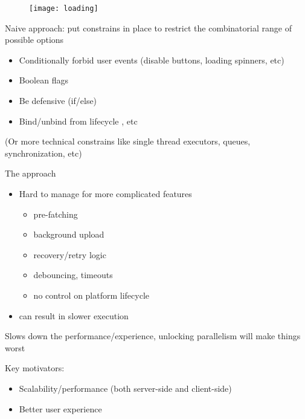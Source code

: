 \documentclass[10pt]{beamer}
\begin{document}
\begin{frame}[fragile]
	\begin{figure}
		\texttt{[image: loading]}
	\end{figure}
\end{frame}
\begin{frame}[fragile]
	Naive approach: put constrains in place to restrict the combinatorial range of possible options  
	\begin{itemize}
		\item Conditionally forbid user events (disable buttons, loading spinners, etc) 
		\item Boolean flags 
		\item Be defensive (if/else) 
		\item Bind/unbind from lifecycle , etc
	\end{itemize}
	(Or more technical constrains like single thread executors, queues, synchronization, etc)
\end{frame}

\begin{frame}
	The approach 
	\begin{itemize}
		\item Hard to manage for more complicated features
	\begin{itemize}
		\item pre-fatching
		\item background upload
		\item recovery/retry logic 
		\item debouncing, timeouts 
		\item no control on platform lifecycle
	\end{itemize}
\item can result in slower execution 
	\end{itemize}
	Slows down the performance/experience, unlocking parallelism will make things worst 
\end{frame}
\begin{frame}[fragile]
	Key motivators:
	\begin{itemize}
		\item Scalability/performance (both server-side  and client-side) 
		\item Better user experience 
	\end{itemize}



\end{frame}
\end{document}
